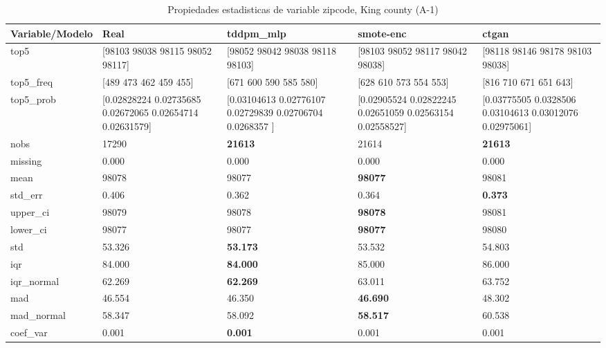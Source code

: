 \begin{table}[H]
\centering
\fontsize{8}{14}\selectfont
\caption{Propiedades  estadisticas de variable zipcode, King county (A-1)}
\label{table-stats-king county-a-1-zipcode}
\begin{tabular}{|l|m{10em}|m{10em}|m{10em}|m{10em}|}
\hline
 \rowcolor[gray]{0.8}
Variable/Modelo & Real & tddpm\_mlp & smote-enc & ctgan \\
\hline top5 & [98103 98038 98115 98052 98117] & [98052 98042 98038 98118 98103] & [98103 98052 98117 98042 98038] & [98118 98146 98178 98103 98038] \\
\hline top5\_freq & [489 473 462 459 455] & [671 600 590 585 580] & [628 610 573 554 553] & [816 710 671 651 643] \\
\hline top5\_prob & [0.02828224 0.02735685 0.02672065 0.02654714 0.02631579] & [0.03104613 0.02776107 0.02729839 0.02706704 0.0268357 ] & [0.02905524 0.02822245 0.02651059 0.02563154 0.02558527] & [0.03775505 0.0328506  0.03104613 0.03012076 0.02975061] \\
\hline nobs & 17290 & \bfseries 21613 & \cellcolor[rgb]{0.9, 0.54, 0.52} 21614 & \bfseries 21613 \\
\hline missing & 0.000 & 0.000 & 0.000 & 0.000 \\
\hline mean & 98078 & 98077 & \bfseries 98077 & \cellcolor[rgb]{0.9, 0.54, 0.52} 98081 \\
\hline std\_err & 0.406 & \cellcolor[rgb]{0.9, 0.54, 0.52} 0.362 & 0.364 & \bfseries 0.373 \\
\hline upper\_ci & 98079 & 98078 & \bfseries 98078 & \cellcolor[rgb]{0.9, 0.54, 0.52} 98081 \\
\hline lower\_ci & 98077 & 98077 & \bfseries 98077 & \cellcolor[rgb]{0.9, 0.54, 0.52} 98080 \\
\hline std & 53.326 & \bfseries 53.173 & 53.532 & \cellcolor[rgb]{0.9, 0.54, 0.52} 54.803 \\
\hline iqr & 84.000 & \bfseries 84.000 & 85.000 & \cellcolor[rgb]{0.9, 0.54, 0.52} 86.000 \\
\hline iqr\_normal & 62.269 & \bfseries 62.269 & 63.011 & \cellcolor[rgb]{0.9, 0.54, 0.52} 63.752 \\
\hline mad & 46.554 & 46.350 & \bfseries 46.690 & \cellcolor[rgb]{0.9, 0.54, 0.52} 48.302 \\
\hline mad\_normal & 58.347 & 58.092 & \bfseries 58.517 & \cellcolor[rgb]{0.9, 0.54, 0.52} 60.538 \\
\hline coef\_var & 0.001 & \bfseries 0.001 & 0.001 & \cellcolor[rgb]{0.9, 0.54, 0.52} 0.001 \\

\end{tabular}
\end{table}
